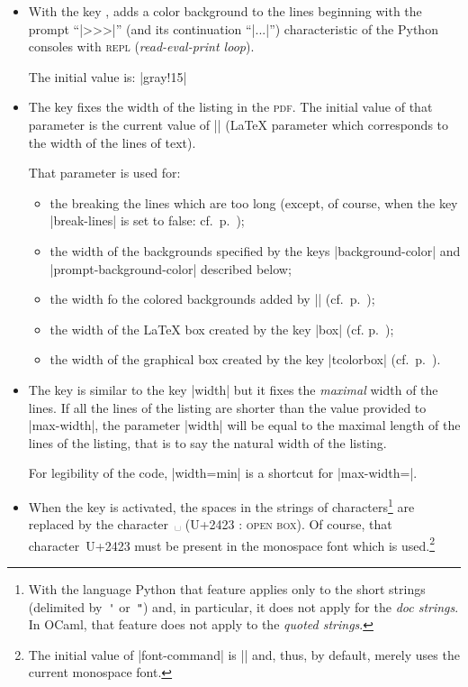 \documentclass{article}
\begin{document}
\begin{itemize}
The default value of the key |rounded-corners| is $4$~pt.\footnote{This value is the
initial value of the \emph{rounded corners} of TikZ.}

\item {} With the key
,  adds a 
color background to the lines beginning with the prompt ``|>>>|'' (and its
continuation ``|...|'') characteristic of the Python consoles with
\textsc{repl} (\emph{read-eval-print loop}).

The initial value is: |gray!15|

\item {} \label{width} The key  fixes the width
of the listing in the \textsc{pdf}. The initial value of that parameter
is the current value of |\linewidth| (LaTeX parameter which corresponds to the
width of the lines of text).

That parameter is used for:
\begin{itemize}
\item the breaking the lines which are too long (except, of course, when the key
|break-lines| is set to false: cf.~p.~\pageref{line-breaks});
\item the width of the backgrounds specified by the keys |background-color| and
|prompt-background-color| described below;
\item the width fo the colored backgrounds added by |\rowcolor|
(cf.~p.~\pageref{rowcolor});
\item the width of the LaTeX box created by the key |box| (cf. p.~\pageref{box});
\item the width of the graphical box created by the key |tcolorbox|
(cf.~p.~\pageref{tcolorbox}).
\end{itemize}

\item {}

The key  is similar to the key |width| but it fixes the
\emph{maximal} width of the lines. If all the lines of the listing are shorter
than the value provided to |max-width|, the parameter |width| will be equal to
the maximal length of the lines of the listing, that is to say the natural width of
the listing.

For legibility of the code, |width=min| is a shortcut for |max-width=\linewidth|.


\item {} When the key
 is activated, the spaces in the 
strings of characters\footnote{With the language Python that feature applies
only to the short strings (delimited by~\verb|'| or~\verb|"|) and, in
particular, it does not apply for the \emph{doc strings}. In OCaml, that
feature does not apply to the \emph{quoted strings}.} are replaced by the
character~␣ (U+2423 : \textsc{open box}). Of course, that character~U+2423
must be present in the monospace font which is used.\footnote{The initial
value of |font-command| is |\ttfamily| and, thus,  by default, 
merely uses the current monospace font.}


\end{itemize}
\end{document}
